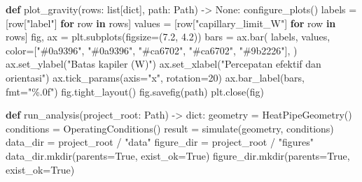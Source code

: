 \documentclass[
  12pt,
  12pt,a4paper,oneside]{report}
\newenvironment{Shaded}{}{}
\newcommand{\BuiltInTok}[1]{\textcolor[rgb]{0.00,0.50,0.00}{#1}}
\newcommand{\ControlFlowTok}[1]{\textcolor[rgb]{0.00,0.44,0.13}{\textbf{#1}}}
\newcommand{\DecValTok}[1]{\textcolor[rgb]{0.25,0.63,0.44}{#1}}
\newcommand{\FloatTok}[1]{\textcolor[rgb]{0.25,0.63,0.44}{#1}}
\newcommand{\KeywordTok}[1]{\textcolor[rgb]{0.00,0.44,0.13}{\textbf{#1}}}
\newcommand{\NormalTok}[1]{#1}
\newcommand{\OperatorTok}[1]{\textcolor[rgb]{0.40,0.40,0.40}{#1}}
\newcommand{\StringTok}[1]{\textcolor[rgb]{0.25,0.44,0.63}{#1}}
\newcommand{\VariableTok}[1]{\textcolor[rgb]{0.10,0.09,0.49}{#1}}
\begin{document}
\begin{Shaded}
\begin{Highlighting}[]
\KeywordTok{def}\NormalTok{ plot\_gravity(rows: }\BuiltInTok{list}\NormalTok{[}\BuiltInTok{dict}\NormalTok{], path: Path) }\OperatorTok{{-}\textgreater{}} \VariableTok{None}\NormalTok{:}
\NormalTok{    configure\_plots()}
\NormalTok{    labels }\OperatorTok{=}\NormalTok{ [row[}\StringTok{"label"}\NormalTok{] }\ControlFlowTok{for}\NormalTok{ row }\KeywordTok{in}\NormalTok{ rows]}
\NormalTok{    values }\OperatorTok{=}\NormalTok{ [row[}\StringTok{"capillary\_limit\_W"}\NormalTok{] }\ControlFlowTok{for}\NormalTok{ row }\KeywordTok{in}\NormalTok{ rows]}
\NormalTok{    fig, ax }\OperatorTok{=}\NormalTok{ plt.subplots(figsize}\OperatorTok{=}\NormalTok{(}\FloatTok{7.2}\NormalTok{, }\FloatTok{4.2}\NormalTok{))}
\NormalTok{    bars }\OperatorTok{=}\NormalTok{ ax.bar(}
\NormalTok{        labels, values,}
\NormalTok{        color}\OperatorTok{=}\NormalTok{[}\StringTok{"\#0a9396"}\NormalTok{, }\StringTok{"\#0a9396"}\NormalTok{, }\StringTok{"\#ca6702"}\NormalTok{, }\StringTok{"\#ca6702"}\NormalTok{, }\StringTok{"\#9b2226"}\NormalTok{],}
\NormalTok{    )}
\NormalTok{    ax.set\_ylabel(}\StringTok{"Batas kapiler (W)"}\NormalTok{)}
\NormalTok{    ax.set\_xlabel(}\StringTok{"Percepatan efektif dan orientasi"}\NormalTok{)}
\NormalTok{    ax.tick\_params(axis}\OperatorTok{=}\StringTok{"x"}\NormalTok{, rotation}\OperatorTok{=}\DecValTok{20}\NormalTok{)}
\NormalTok{    ax.bar\_label(bars, fmt}\OperatorTok{=}\StringTok{"\%.0f"}\NormalTok{)}
\NormalTok{    fig.tight\_layout()}
\NormalTok{    fig.savefig(path)}
\NormalTok{    plt.close(fig)}


\KeywordTok{def}\NormalTok{ run\_analysis(project\_root: Path) }\OperatorTok{{-}\textgreater{}} \BuiltInTok{dict}\NormalTok{:}
\NormalTok{    geometry }\OperatorTok{=}\NormalTok{ HeatPipeGeometry()}
\NormalTok{    conditions }\OperatorTok{=}\NormalTok{ OperatingConditions()}
\NormalTok{    result }\OperatorTok{=}\NormalTok{ simulate(geometry, conditions)}
\NormalTok{    data\_dir }\OperatorTok{=}\NormalTok{ project\_root }\OperatorTok{/} \StringTok{"data"}
\NormalTok{    figure\_dir }\OperatorTok{=}\NormalTok{ project\_root }\OperatorTok{/} \StringTok{"figures"}
\NormalTok{    data\_dir.mkdir(parents}\OperatorTok{=}\VariableTok{True}\NormalTok{, exist\_ok}\OperatorTok{=}\VariableTok{True}\NormalTok{)}
\NormalTok{    figure\_dir.mkdir(parents}\OperatorTok{=}\VariableTok{True}\NormalTok{, exist\_ok}\OperatorTok{=}\VariableTok{True}\NormalTok{)}


\end{Highlighting}
\end{Shaded}
\end{document}
